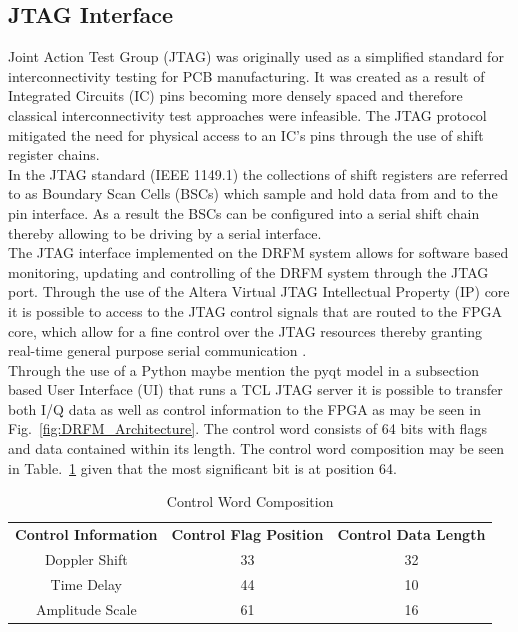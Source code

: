 	\subsection{JTAG Interface}
		\noindent Joint Action Test Group (JTAG) was originally used as a simplified standard for interconnectivity testing for PCB manufacturing. It was created as a result of Integrated Circuits (IC) pins becoming more densely spaced and therefore classical interconnectivity test approaches were infeasible. The JTAG protocol mitigated the need for physical access to an IC's pins through the use of shift register chains.  \\ \newline In the JTAG standard (IEEE 1149.1) the collections of shift registers are referred to as Boundary Scan Cells (BSCs) which sample and hold data from and to the pin interface. As a result the BSCs can be configured into a serial shift chain thereby allowing to be driving by a serial interface. \\ \newline 	The JTAG interface implemented on the DRFM system allows for software based monitoring, updating and controlling of the DRFM system through the JTAG port.  Through the use of the Altera Virtual JTAG Intellectual Property (IP) core it is possible to access to the JTAG control signals that are routed to the FPGA core, which allow for a fine control over the JTAG resources thereby granting real-time general purpose serial communication \cite{JTAG}. \\ \newline	Through the use of  a Python {\color{red} maybe mention the pyqt model in a subsection} based User Interface (UI) that runs a TCL JTAG server it is possible to transfer both I/Q data as well as control information to the FPGA as may be seen in Fig.~\ref{fig:DRFM_Architecture}. The control word consists of 64 bits with flags and data contained within its length. The control word composition may be seen in Table.~\ref{tab:Control_Info} given that the most significant bit is at position 64.
		
		\begin{table}[h!]
			\centering
			\caption{Control Word Composition}
			\begin{tabular}{ccc}

				\textbf{Control Information} & \textbf{Control Flag Position} & \textbf{Control Data Length} \\ 
				Doppler Shift 	& 33 & 32  \\
				Time Delay    	& 44 & 10 \\
				Amplitude Scale & 61 & 16 
			\end{tabular}
		\label{tab:Control_Info}
		\end{table}
	
